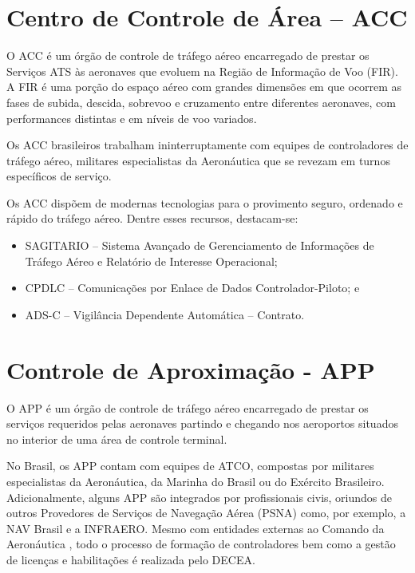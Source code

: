 \documentclass[
]{book}
\providecommand{\tightlist}{%
  \setlength{\itemsep}{0pt}\setlength{\parskip}{0pt}}
\theoremstyle{definition}
\theoremstyle{definition}
\theoremstyle{definition}
\theoremstyle{definition}
\theoremstyle{remark}
\begin{document}
\hypertarget{centro-de-controle-de-uxe1rea-acc}{%
\section{Centro de Controle de Área -- ACC}\label{centro-de-controle-de-uxe1rea-acc}}

O ACC é um órgão de controle de tráfego aéreo encarregado de prestar os Serviços ATS às aeronaves que evoluem na Região de Informação de Voo (FIR). A FIR é uma porção do espaço aéreo com grandes dimensões em que ocorrem as fases de subida, descida, sobrevoo e cruzamento entre diferentes aeronaves, com performances distintas e em níveis de voo variados.

Os ACC brasileiros trabalham ininterruptamente com equipes de controladores de tráfego aéreo, militares especialistas da Aeronáutica que se revezam em turnos específicos de serviço.

Os ACC dispõem de modernas tecnologias para o provimento seguro, ordenado e rápido do tráfego aéreo. Dentre esses recursos, destacam-se:

\begin{itemize}
\tightlist
\item
  SAGITARIO -- Sistema Avançado de Gerenciamento de Informações de Tráfego Aéreo e Relatório de Interesse Operacional;
\item
  CPDLC -- Comunicações por Enlace de Dados Controlador-Piloto; e
\item
  ADS-C -- Vigilância Dependente Automática -- Contrato.
\end{itemize}

\hypertarget{controle-de-aproximauxe7uxe3o---app}{%
\section{Controle de Aproximação - APP}\label{controle-de-aproximauxe7uxe3o---app}}

O APP é um órgão de controle de tráfego aéreo encarregado de prestar os serviços requeridos pelas aeronaves partindo e chegando nos aeroportos situados no interior de uma área de controle terminal.

No Brasil, os APP contam com equipes de ATCO, compostas por militares especialistas da Aeronáutica, da Marinha do Brasil ou do Exército Brasileiro. Adicionalmente, alguns APP são integrados por profissionais civis, oriundos de outros Provedores de Serviços de Navegação Aérea (PSNA) como, por exemplo, a NAV Brasil e a INFRAERO. Mesmo com entidades externas ao Comando da Aeronáutica , todo o processo de formação de controladores bem como a gestão de licenças e habilitações é realizada pelo DECEA.
\end{document}
